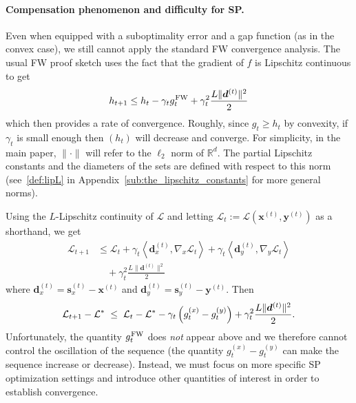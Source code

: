 \documentclass[twoside]{article}
\newcommand{\R}{\mathbb{R}}
\renewcommand{\L}{\mathcal{L}}
\newcommand{\xt}{\bm{x}^{(t)}}
\newcommand{\st}{\bm{s}^{(t)}}
\newcommand{\dt}{\bm{d}^{(t)}}
\newcommand{\yt}{\bm{y}^{(t)}}
\newcommand{\gap}{g_{t}}
\newcommand{\FW}{{\hspace{0.05em}\textnormal{FW}}}
\newcommand{\innerProd}[2]{\left\langle #1 , #2 \right\rangle}
\newcommand{\0}{\mathbf{0}} %
\begin{document}
%


%
%
%




\paragraph{Compensation phenomenon and difficulty for SP.} %
\label{par:the_compensation_phenomenon}
Even when equipped with a suboptimality error and a gap function (as in the convex case), we still cannot apply the standard FW convergence analysis. 
The usual FW proof sketch uses the fact that the gradient of $f$ is Lipschitz continuous to get
\begin{equation} \label{eq:FWstandard}
  h_{t+1} \leq h_t - \gamma_t g_t^{\FW} + \gamma_t^2 \frac{L\|\dt\|^2}{2}
\end{equation}
which then provides a rate of convergence. 
Roughly, since $g_t \geq h_t$ by convexity, if $\gamma_t$ is small enough then $(h_t)$ will decrease and converge. 
For simplicity, in the main paper, $\|\cdot\|$ will refer to the $\ell_2$ norm of $\R^d$. 
The partial Lipschitz constants and the diameters of the sets are defined with respect to this norm (see~\eqref{def:lipL} in Appendix~\ref{sub:the_lipschitz_constants} for more general norms).

Using the $L$-Lipschitz continuity of $\L$ and letting $\L_t := \L(\xt, \yt)$ as a shorthand, we get
\begin{equation}
\begin{aligned}
  \L_{t+1}
  & \leq \L_t + \gamma_t \innerProd{\dt_x}{\nabla_x \L_t}  + \gamma_t \innerProd{\dt_y}{\nabla_y \L_t}   \\
  & \quad+ \gamma_t^2\frac{L\|\dt\|^2}{2}
\end{aligned}
\end{equation}
%
%
%
%
%
%
where $\dt_x = \st_x - \xt$ and $\dt_y=\st_y-\yt$. 
Then 
\begingroup
\setlength{\thinmuskip}{0mu}
\setlength{\medmuskip}{0mu}
\setlength{\thickmuskip}{0mu}
\begin{equation}\label{eq:oscilation}
  \hspace{-1mm} \L_{t+1} - \L^*
   \hspace{1mm} \leq \hspace{1mm} \L_t - \L^*
    - \gamma_t \left( g^{(x)}_t -  g_t^{(y)}\right) 
    + \gamma_t^2 \frac{L \|\dt\|^2}{2}. \hspace{-1mm}
\end{equation}
\endgroup
Unfortunately, the quantity $\gap^{\FW}$ does \emph{not} appear above and we therefore cannot control the oscillation of the sequence (the quantity $g^{(x)}_t -  g_t^{(y)}$ can make the sequence increase or decrease). 
Instead, we must focus on more specific SP optimization settings and introduce other quantities of interest in order to establish convergence.
%
\end{document}
